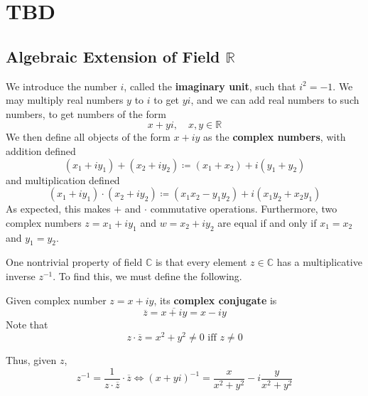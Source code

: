\section{TBD}

  \subsection[Algebraic Extension of Field R]{Algebraic Extension of Field $\mathbb{R}$}

  We introduce the number $i$, called the \textbf{imaginary unit}, such that $i^2 = -1$. We may multiply real numbers $y$ to $i$ to get $yi$, and we can add real numbers to such numbers, to get numbers of the form 
  \begin{equation}
    x + yi, \quad x, y \in \mathbb{R}
  \end{equation}
  We then define all objects of the form $x + iy$ as the \textbf{complex numbers}, with addition defined
  \begin{equation}
    (x_1 + i y_1) + (x_2 + i y_2) \coloneqq (x_1 + x_2) + i (y_1 + y_2)
  \end{equation}
  and multiplication defined
  \begin{equation}
    (x_1 + i y_1) \cdot (x_2 + i y_2) \coloneqq (x_1 x_2 - y_1 y_2) + i (x_1 y_2 + x_2 y_1)
  \end{equation}
  As expected, this makes $+$ and $\cdot$ commutative operations. Furthermore, two complex numbers $z = x_1 + i y_1$ and $w = x_2 + i y_2$ are equal if and only if $x_1 = x_2$ and $y_1 = y_2$. 

  One nontrivial property of field $\mathbb{C}$ is that every element $z \in \mathbb{C}$ has a multiplicative inverse $z^{-1}$. To find this, we must define the following. 

  \begin{definition}
    \label{def:complex-conjugate}
    Given complex number $z = x + i y$, its \textbf{complex conjugate} is 
    \begin{equation}
      \overline{z} = \overline{x + iy} = x - iy
    \end{equation}
    Note that 
    \begin{equation}
      z \cdot \overline{z} = x^2 + y^2 \neq 0 \text{ iff } z \neq 0
    \end{equation}
  \end{definition}

  Thus, given $z$, 
  \begin{equation}
    z^{-1} = \frac{1}{z \cdot \overline{z}} \cdot \overline{z} \iff (x + yi)^{-1} = \frac{x}{x^2 + y^2} - i \frac{y}{x^2 + y^2}
  \end{equation}

